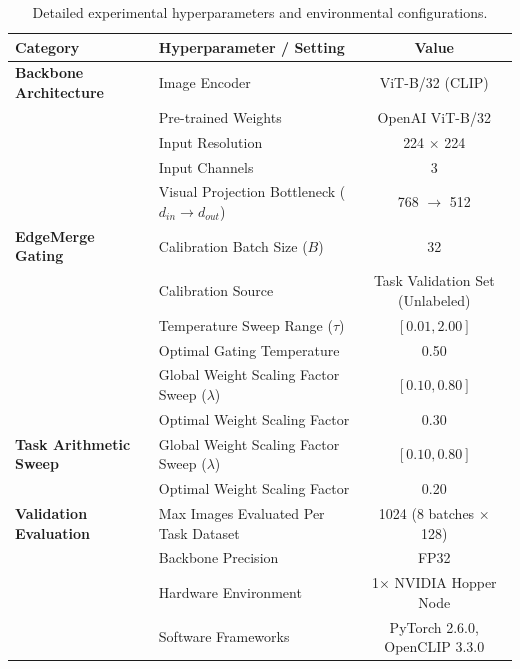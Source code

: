 \documentclass{article}
\theoremstyle{plain}
\theoremstyle{definition}
\theoremstyle{remark}
\begin{document}
\begin{table}[h]
\caption{Detailed experimental hyperparameters and environmental configurations.}
\label{tab:hyperparams}
\vskip 0.15in
\begin{center}
\begin{small}
\begin{sc}
\begin{tabular}{llc}
\toprule
Category & Hyperparameter / Setting & Value \\
\midrule
\textbf{Backbone Architecture} & Image Encoder & ViT-B/32 (CLIP) \\
                               & Pre-trained Weights & OpenAI ViT-B/32 \\
                               & Input Resolution & 224 $\times$ 224 \\
                               & Input Channels & 3 \\
                               & Visual Projection Bottleneck ($d_{in} \to d_{out}$) & 768 $\to$ 512 \\
\midrule
\textbf{EdgeMerge Gating}      & Calibration Batch Size ($B$) & 32 \\
                               & Calibration Source & Task Validation Set (Unlabeled) \\
                               & Temperature Sweep Range ($\tau$) & $[0.01, 2.00]$ \\
                               & Optimal Gating Temperature & 0.50 \\
                               & Global Weight Scaling Factor Sweep ($\lambda$) & $[0.10, 0.80]$ \\
                               & Optimal Weight Scaling Factor & 0.30 \\
\midrule
\textbf{Task Arithmetic Sweep} & Global Weight Scaling Factor Sweep ($\lambda$) & $[0.10, 0.80]$ \\
                               & Optimal Weight Scaling Factor & 0.20 \\
\midrule
\textbf{Validation Evaluation}  & Max Images Evaluated Per Task Dataset & 1024 (8 batches $\times$ 128) \\
                               & Backbone Precision & FP32 \\
                               & Hardware Environment & 1$\times$ NVIDIA Hopper Node \\
                               & Software Frameworks & PyTorch 2.6.0, OpenCLIP 3.3.0 \\
\bottomrule
\end{tabular}
\end{sc}
\end{small}
\end{center}
\vskip -0.1in
\end{table}
\end{document}
